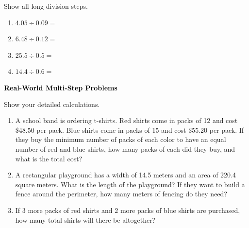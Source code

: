 \documentclass[12pt, letterpaper, fleql]{article}
\newcommand{\blank}{\underline{\hspace{2.2cm}}}
\begin{document}
\noindent
Show all long division steps.

\vspace{3mm}
\begin{enumerate}[itemsep=2.2cm, leftmargin=0.6cm]
\item $4.05 \div 0.09 = $ \blank

\vspace{2cm}

\item $6.48 \div 0.12 = $ \blank

\vspace{2cm}

\item $25.5 \div 0.5 = $ \blank

\vspace{2cm}

\item $14.4 \div 0.6 = $ \blank

\vspace{2cm}


\end{enumerate}

\newpage

\begin{tcolorbox}[colback=black!10]
\large\textcolor{black}{\textbf{Real-World Multi-Step Problems}}
\end{tcolorbox}

\noindent
Show your detailed calculations.

\vspace{3mm}
\begin{enumerate}[itemsep=2.3cm, leftmargin=0.6cm]
\item A school band is ordering t-shirts. Red shirts come in packs of 12 and cost \$48.50 per pack. Blue shirts come in packs of 15 and cost \$55.20 per pack. If they buy the minimum number of packs of each color to have an equal number of red and blue shirts, how many packs of each did they buy, and what is the total cost?

\vspace{1.8cm}

\item A rectangular playground has a width of 14.5 meters and an area of 220.4 square meters. What is the length of the playground? If they want to build a fence around the perimeter, how many meters of fencing do they need?

\vspace{1.8cm}

\item If 3 more packs of red shirts and 2 more packs of blue shirts are purchased, how many total shirts will there be altogether?

\vspace{1.8cm}

\end{enumerate}
\end{document}
